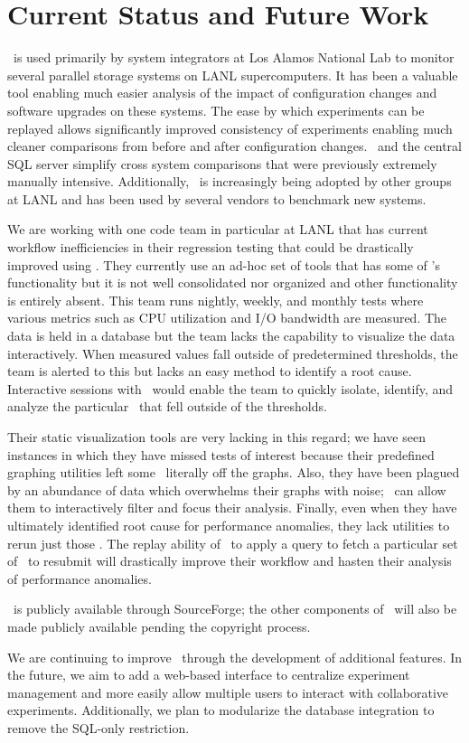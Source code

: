 \section{Current Status and Future Work}
\label{future}

\name\ is used primarily by system integrators at Los Alamos National Lab to
monitor several parallel storage systems on LANL supercomputers.  It has been a
valuable tool enabling much easier analysis of the impact of configuration
changes and software upgrades on these systems.  The ease by which experiments
can be replayed allows significantly improved consistency of experiments
enabling much cleaner  comparisons from before and after
configuration changes.  \dbviz\ and the central SQL server simplify cross
system comparisons that were previously extremely manually intensive.
Additionally, \name\ is increasingly being adopted by other groups at LANL and
has been used by several vendors to benchmark new systems.  

We are working with one code team in particular at LANL that has current
workflow inefficiencies in their regression testing that could be drastically
improved using \name.  They currently use an ad-hoc set of tools that has some
of \name's functionality but it is not well consolidated nor organized and
other functionality is entirely absent.  This team runs nightly, weekly, and
monthly tests where various metrics such as CPU utilization and I/O bandwidth
are measured.  The data is held in a database but the team lacks the capability
to visualize the data interactively.  When measured values fall outside of
predetermined thresholds, the team is alerted to this but lacks an easy method
to identify a root cause.  Interactive sessions with \dbviz\ would enable the
team to quickly isolate, identify, and analyze the particular \subs\ that fell
outside of the thresholds.  

Their static visualization tools are very lacking in this regard; we have seen
instances in which they have missed tests of interest because their predefined
graphing utilities left some \subs\ literally off the graphs.  Also, they have
been plagued by an abundance of data which overwhelms their graphs with noise;
\dbviz\ can allow them to interactively filter and focus their analysis.
Finally, even when they have ultimately identified root cause for performance
anomalies, they lack utilities to rerun just those \subs.  The replay ability
of \name\ to apply a query to fetch a particular set of \subs\ to resubmit will
drastically improve their workflow and hasten their analysis of performance
anomalies. 
 
\dbviz\ is publicly available through SourceForge; the other components of
\name\ will also be made publicly available pending the copyright process.

We are continuing to improve \name\ through the development of additional
features.  In the future, we aim to add a web-based interface to centralize
experiment management and more easily allow multiple users to interact with
collaborative experiments.  Additionally, we plan to modularize the database
integration to remove the SQL-only restriction. 
